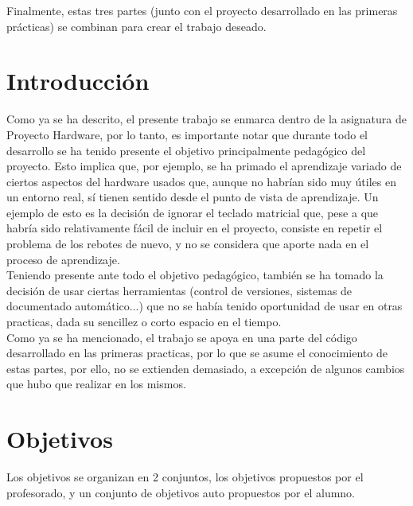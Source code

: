 \documentclass[12pt,letterpaper]{article}
\begin{document}
Finalmente, estas tres partes (junto con el proyecto desarrollado en
las primeras prácticas) se combinan para crear el trabajo deseado.

\section{Introducción}
\label{sec:introduccion}

Como ya se ha descrito, el presente trabajo se enmarca dentro de la
asignatura de Proyecto Hardware, por lo tanto, es importante notar que
durante todo el desarrollo se ha tenido presente el objetivo
principalmente pedagógico del proyecto. Esto implica que, por ejemplo,
se ha primado el aprendizaje variado de ciertos aspectos del hardware
usados que, aunque no habrían sido muy útiles en un entorno real, sí
tienen sentido desde el punto de vista de aprendizaje. Un ejemplo de
esto es la decisión de ignorar el teclado matricial que, pese a que
habría sido relativamente fácil de incluir en el proyecto, consiste en
repetir el problema de los rebotes de nuevo, y no se considera que
aporte nada en el proceso de aprendizaje.\\

Teniendo presente ante todo el objetivo pedagógico, también se ha
tomado la decisión de usar ciertas herramientas (control de versiones,
sistemas de documentado automático...) que no se había tenido
oportunidad de usar en otras practicas, dada su sencillez o corto
espacio en el tiempo.\\

Como ya se ha mencionado, el trabajo se apoya en una parte del código
desarrollado en las primeras practicas, por lo que se asume el
conocimiento de estas partes, por ello, no se extienden demasiado, a
excepción de algunos cambios que hubo que realizar en los mismos.

\section{Objetivos}
\label{sec:objetivos}

Los objetivos se organizan en 2 conjuntos, los objetivos propuestos
por el profesorado, y un conjunto de objetivos auto propuestos por el
alumno.
\end{document}
